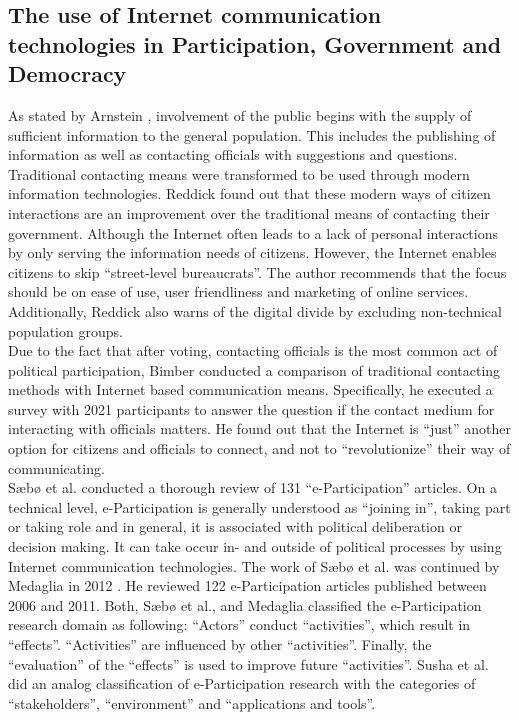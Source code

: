 \subsection{The use of Internet communication technologies in Participation, Government and Democracy}
As stated by Arnstein \cite{Arnstein1969_citizen_participation}, involvement of the public begins with the supply of sufficient information to the general population. This includes the publishing of information as well as contacting officials with suggestions and questions. Traditional contacting means were transformed to be used through modern information technologies. Reddick \cite{Reddick2005_Citizen_interaction_with_egovernment} found out that these modern ways of citizen interactions are an improvement over the traditional means of contacting their government. Although the Internet often leads to a lack of personal interactions by only serving the information needs of citizens. However, the Internet enables citizens to skip ``street-level bureaucrats''. The author recommends that the focus should be on ease of use, user friendliness and marketing of online services. Additionally, Reddick also warns of the digital divide by excluding non-technical population groups.\\
Due to the fact that after voting, contacting officials is the most common act of political participation, Bimber \cite{Bimber1999_Citizen_communication_with_government} conducted a comparison of traditional contacting methods with Internet based communication means. Specifically, he executed a survey with 2021 participants to answer the question if the contact medium for interacting with officials matters. He found out that the Internet is ``just'' another option for citizens and officials to connect, and not to ``revolutionize'' their way of communicating.\\
S{\ae}b{\o} et al. \cite{Saebo_eParticipation} conducted a thorough review of 131 ``e-Participation'' articles. On a technical level, e-Participation is generally understood as ``joining in'', taking part or taking role and in general, it is associated with political deliberation or decision making. It can take occur in- and outside of political processes by using Internet communication technologies. The work of S{\ae}b{\o} et al. was continued by Medaglia in 2012 \cite{Medaglia2012_eParticipation}. He reviewed 122 e-Participation articles published between 2006 and 2011. Both, S{\ae}b{\o} et al., and Medaglia classified the e-Participation research domain as following: ``Actors'' conduct ``activities'', which result in ``effects''. ``Activities'' are influenced by other ``activities''. Finally, the ``evaluation'' of the ``effects'' is used to improve future ``activities''. Susha et al. \cite{Susha2012_eParticipation} did an analog classification of e-Participation research with the categories of ``stakeholders'', ``environment'' and ``applications and tools''.\\
